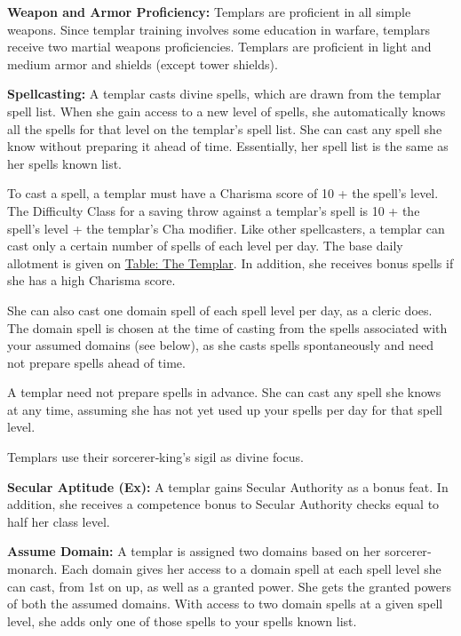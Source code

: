 \textbf{Weapon and Armor Proficiency:} Templars are proficient in all simple weapons. Since templar training involves some education in warfare, templars receive two martial weapons proficiencies. Templars are proficient in light and medium armor and shields (except tower shields).

\textbf{Spellcasting:} A templar casts divine spells, which are drawn from the templar spell list. When she gain access to a new level of spells, she automatically knows all the spells for that level on the templar's spell list. She can cast any spell she know without preparing it ahead of time. Essentially, her spell list is the same as her spells known list.

To cast a spell, a templar must have a Charisma score of 10 + the spell's level. The Difficulty Class for a saving throw against a templar's spell is 10 + the spell's level + the templar's Cha modifier. Like other spellcasters,
a templar can cast only a certain number of spells of each level per day. The base daily allotment is given on \hyperref[tab:The Templar]{Table: The Templar}. In addition, she receives bonus spells if she has a high Charisma score.

She can also cast one domain spell of each spell level per day, as a cleric does. The domain spell is chosen at the time of casting from the spells associated with your assumed domains (see below), as she casts spells spontaneously and need not prepare spells ahead of time.

A templar need not prepare spells in advance. She can cast any spell she knows at any time, assuming she has not yet used up your spells per day for that spell level.

Templars use their sorcerer‐king's sigil as divine focus.

\textbf{Secular Aptitude (Ex):} A templar gains Secular Authority as a bonus feat. In addition, she receives a competence bonus to Secular Authority checks equal to half her class level.

\textbf{Assume Domain:} A templar is assigned two domains based on her sorcerer‐monarch. Each domain gives her access to a domain spell at each spell level she can cast, from 1st on up, as well as a granted power. She gets the granted powers of both the assumed domains. With access to two domain spells at a given spell level, she adds only one of those spells to your spells known list.


